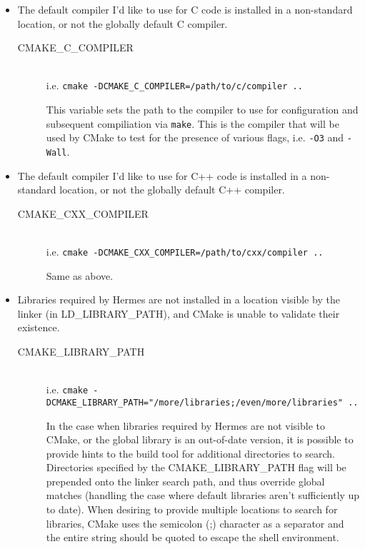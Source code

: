 \documentclass[11pt]{article}
\begin{document}
\begin{itemize}
  \item The default compiler I'd like to use for C code is installed in a non-standard location, or not the globally default C compiler.
  \begin{description}
    \item[CMAKE\_C\_COMPILER] \hfill \\
      i.e. {\tt cmake -DCMAKE\_C\_COMPILER=/path/to/c/compiler ..} \hfill \\
      \begin{spacing}{.5}
      \end{spacing}
        This variable sets the path to the compiler to use for configuration and subsequent compiliation via {\tt make}. This is the compiler that will be used by CMake to test for the presence of various flags, i.e. {\tt -O3} and {\tt -Wall}.
  \end{description}

  \item The default compiler I'd like to use for C++ code is installed in a non-standard location, or not the globally default C++ compiler.
  \begin{description}
    \item[CMAKE\_CXX\_COMPILER] \hfill \\
      i.e. {\tt cmake -DCMAKE\_CXX\_COMPILER=/path/to/cxx/compiler ..} \hfill \\
      \begin{spacing}{.5}
      \end{spacing}
        Same as above.
  \end{description}

  \item Libraries required by Hermes are not installed in a location visible by the linker (in LD\_LIBRARY\_PATH), and CMake is unable to validate their existence.
  \begin{description}
    \item[CMAKE\_LIBRARY\_PATH] \hfill \\
      i.e. {\tt cmake -DCMAKE\_LIBRARY\_PATH="/more/libraries;/even/more/libraries" ..} \hfill \\
      \begin{spacing}{.5}
      \end{spacing}
        In the case when libraries required by Hermes are not visible to CMake, or the global library is an out-of-date version, it is possible to provide hints to the build tool for additional directories to search. Directories specified by the CMAKE\_LIBRARY\_PATH flag will be prepended onto the linker search path, and thus override global matches (handling the case where default libraries aren't sufficiently up to date). When desiring to provide multiple locations to search for libraries, CMake uses the semicolon (;) character as a separator and the entire string should be quoted to escape the shell environment.
  \end{description}


\end{itemize}
\end{document}
